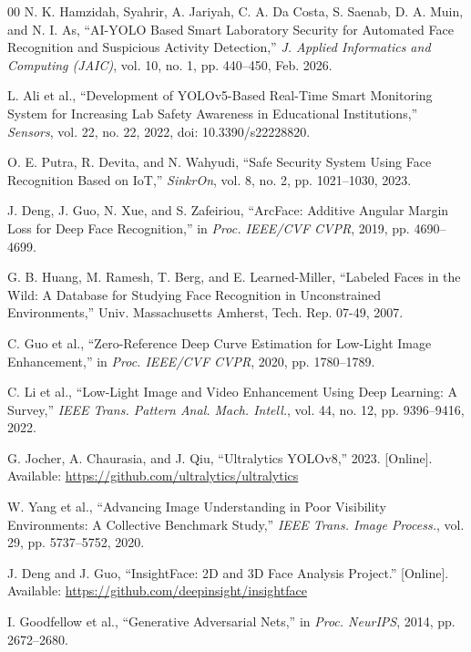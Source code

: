\documentclass[conference]{IEEEtran}
\begin{document}
\begin{thebibliography}{00}
N. K. Hamzidah, Syahrir, A. Jariyah, C. A. Da Costa, S. Saenab,
D. A. Muin, and N. I. As, ``AI-YOLO Based Smart Laboratory
Security for Automated Face Recognition and Suspicious Activity
Detection,'' \textit{J. Applied Informatics and Computing
(JAIC)}, vol. 10, no. 1, pp. 440--450, Feb. 2026.

L. Ali et al., ``Development of YOLOv5-Based Real-Time Smart
Monitoring System for Increasing Lab Safety Awareness in
Educational Institutions,'' \textit{Sensors}, vol. 22, no. 22,
2022, doi: 10.3390/s22228820.

O. E. Putra, R. Devita, and N. Wahyudi, ``Safe Security System
Using Face Recognition Based on IoT,'' \textit{SinkrOn}, vol. 8,
no. 2, pp. 1021--1030, 2023.

J. Deng, J. Guo, N. Xue, and S. Zafeiriou, ``ArcFace: Additive
Angular Margin Loss for Deep Face Recognition,'' in \textit{Proc.
IEEE/CVF CVPR}, 2019, pp. 4690--4699.

G. B. Huang, M. Ramesh, T. Berg, and E. Learned-Miller,
``Labeled Faces in the Wild: A Database for Studying Face
Recognition in Unconstrained Environments,'' Univ. Massachusetts
Amherst, Tech. Rep. 07-49, 2007.

C. Guo et al., ``Zero-Reference Deep Curve Estimation for
Low-Light Image Enhancement,'' in \textit{Proc. IEEE/CVF CVPR},
2020, pp. 1780--1789.

C. Li et al., ``Low-Light Image and Video Enhancement Using Deep
Learning: A Survey,'' \textit{IEEE Trans. Pattern Anal. Mach.
Intell.}, vol. 44, no. 12, pp. 9396--9416, 2022.

G. Jocher, A. Chaurasia, and J. Qiu, ``Ultralytics YOLOv8,''
2023. [Online]. Available:
\url{https://github.com/ultralytics/ultralytics}

W. Yang et al., ``Advancing Image Understanding in Poor
Visibility Environments: A Collective Benchmark Study,''
\textit{IEEE Trans. Image Process.}, vol. 29, pp. 5737--5752,
2020.

J. Deng and J. Guo, ``InsightFace: 2D and 3D Face Analysis
Project.'' [Online]. Available:
\url{https://github.com/deepinsight/insightface}

I. Goodfellow et al., ``Generative Adversarial Nets,'' in
\textit{Proc. NeurIPS}, 2014, pp. 2672--2680.


\end{thebibliography}
\end{document}
